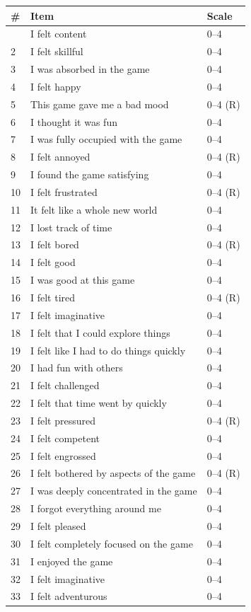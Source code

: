 \begin{longtable}[]{@{}lll@{}}
\toprule\noalign{}
\# & Item & Scale \\
\midrule\noalign{}
\endhead
\bottomrule\noalign{}
\endlastfoot
1 & I felt content & 0--4 \\
2 & I felt skillful & 0--4 \\
3 & I was absorbed in the game & 0--4 \\
4 & I felt happy & 0--4 \\
5 & This game gave me a bad mood & 0--4 (R) \\
6 & I thought it was fun & 0--4 \\
7 & I was fully occupied with the game & 0--4 \\
8 & I felt annoyed & 0--4 (R) \\
9 & I found the game satisfying & 0--4 \\
10 & I felt frustrated & 0--4 (R) \\
11 & It felt like a whole new world & 0--4 \\
12 & I lost track of time & 0--4 \\
13 & I felt bored & 0--4 (R) \\
14 & I felt good & 0--4 \\
15 & I was good at this game & 0--4 \\
16 & I felt tired & 0--4 (R) \\
17 & I felt imaginative & 0--4 \\
18 & I felt that I could explore things & 0--4 \\
19 & I felt like I had to do things quickly & 0--4 \\
20 & I had fun with others & 0--4 \\
21 & I felt challenged & 0--4 \\
22 & I felt that time went by quickly & 0--4 \\
23 & I felt pressured & 0--4 (R) \\
24 & I felt competent & 0--4 \\
25 & I felt engrossed & 0--4 \\
26 & I felt bothered by aspects of the game & 0--4 (R) \\
27 & I was deeply concentrated in the game & 0--4 \\
28 & I forgot everything around me & 0--4 \\
29 & I felt pleased & 0--4 \\
30 & I felt completely focused on the game & 0--4 \\
31 & I enjoyed the game & 0--4 \\
32 & I felt imaginative & 0--4 \\
33 & I felt adventurous & 0--4 \\
\end{longtable}

